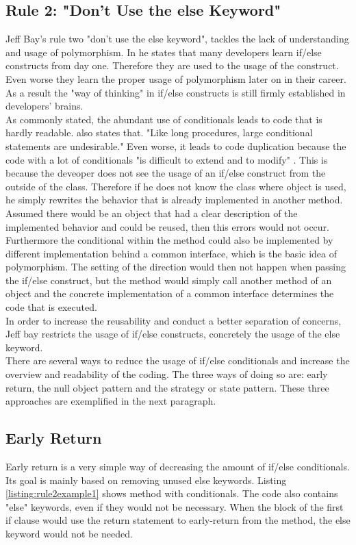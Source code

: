 \subsection*{Rule 2: "Don’t Use the else Keyword"}
\label{describe:rule2}
Jeff Bay's rule two "don’t use the else keyword", tackles the lack of understanding and usage of polymorphism. 
In \cite{oc2008} he states that many developers learn if/else constructs from day one. Therefore they are used to the usage of the construct. Even worse they learn the proper usage of polymorphism later on in their career. As a result the "way of thinking" in if/else constructs is still firmly established in developers' brains.
\\

As commonly stated, the abundant use of conditionals leads to code that is hardly readable. \cite{gof} also states that. "Like long procedures, large conditional statements are undesirable." \cite{gof} Even worse, it leads to code duplication because the code with a lot of conditionals "is difficult to extend and to modify" \cite{gof}. This is because the deveoper does not see the usage of an if/else construct from the outside of the class. Therefore if he does not know the class where object is used, he simply rewrites the behavior that is already implemented in another method. Assumed there would be an object that had a clear description of the implemented behavior and could be reused, then this errors would not occur. Furthermore the conditional within the method could also be implemented by different implementation behind a common interface, which is the basic idea of polymorphism. The setting of the direction would then not happen when passing the if/else construct, but the method would simply call another method of an object and the concrete implementation of a common interface determines the code that is executed. 
\\

In order to increase the reusability and conduct a better separation of concerns, Jeff bay restricts the usage of if/else constructs, concretely the usage of the else keyword.
\\

There are several ways to reduce the usage of if/else conditionals and increase the overview and readability of the coding. The three ways of doing so are: early return, the null object pattern and the strategy or state pattern. These three approaches are exemplified in the next paragraph. 

\subsection*{Early Return}
Early return is a very simple way of decreasing the amount of if/else conditionals. Its goal is mainly based on removing unused else keywords. Listing \ref{listing:rule2example1} shows method with conditionals. The code also contains "else" keywords, even if they would not be necessary. When the block of the first if clause would use the return statement to early-return from the method, the else keyword would not be needed.
\\

